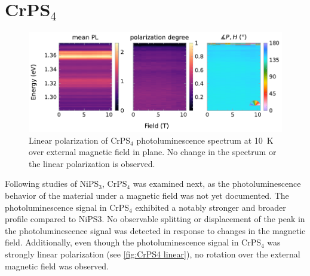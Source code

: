 \documentclass[
	twoside,
	parskip=half,
	a4paper,
]{scrbook}
\begin{document}
\section{CrPS$_4$}
\begin{figure}
	\centering
	\includegraphics{../figures/2024-04-09 CrPS4 linear Polarisation.pdf}
	\caption{Linear polarization of CrPS$_4$ photoluminescence spectrum at \SI{10}{K} over external magnetic field in plane. No change in the spectrum or the linear polarization is observed.}
	\label{fig:CrPS4 linear}
\end{figure}
Following studies of NiPS$_3$, CrPS$_4$ was examined next, as the photoluminescence behavior of the material under a magnetic field was not yet documented.
The photoluminescence signal in CrPS$_4$ exhibited a notably stronger and broader profile compared to NiPS3.
No observable splitting or displacement of the peak in the photoluminescence signal was detected in response to changes in the magnetic field. 
Additionally, even though the photoluminescence signal in CrPS$_4$ was strongly linear polarization (see \autoref{fig:CrPS4 linear}), no rotation over the external magnetic field was observed.
\end{document}
